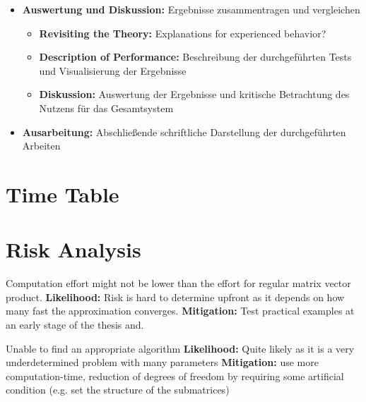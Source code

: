 \documentclass[lang=ngerman,inputenc=utf8,fontsize=10pt]{ldvarticle}
\begin{document}
\begin{itemize}
	\item \textbf{Auswertung und Diskussion:} Ergebnisse zusammentragen und vergleichen
		\begin{itemize}
			\item \textbf{Revisiting the Theory:} Explanations for experienced behavior?
			\item \textbf{Description of Performance:} Beschreibung der durchgeführten Tests und Visualisierung der Ergebnisse
			\item \textbf{Diskussion:} Auswertung der Ergebnisse und kritische Betrachtung des Nutzens für das Gesamtsystem
		\end{itemize}
	\item \textbf{Ausarbeitung:} Abschließende schriftliche Darstellung der durchgeführten Arbeiten
\end{itemize}

\section{Time Table}









\section{Risk Analysis}

Computation effort might not be lower than the effort for regular matrix vector product.
\newline\textbf{Likelihood:} Risk is hard to determine upfront as it depends on how many fast the approximation converges.
\newline\textbf{Mitigation:} Test practical examples at an early stage of the thesis and.

Unable to find an appropriate algorithm
\newline\textbf{Likelihood:} Quite likely as it is a very underdetermined problem with many parameters
\newline\textbf{Mitigation:} use more computation-time, reduction of degrees of freedom by requiring some artificial condition (e.g. set the structure of the submatrices)


\printbibliography
\end{document}
